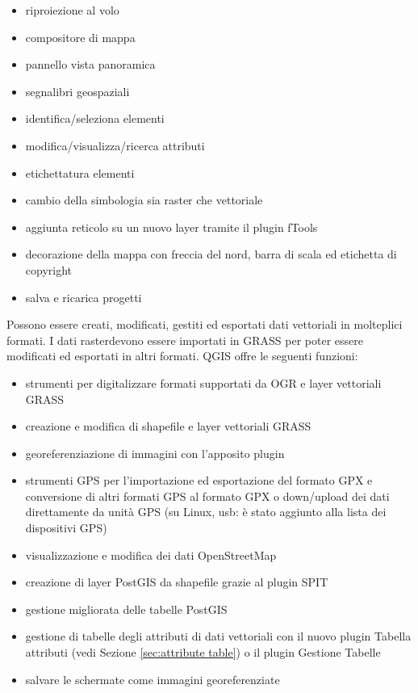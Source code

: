 \begin{itemize}[label=--]
\item riproiezione al volo
\item compositore di mappa
\item pannello vista panoramica
\item segnalibri geospaziali
\item identifica/seleziona elementi
\item modifica/visualizza/ricerca attributi
\item etichettatura elementi
\item cambio della simbologia sia raster che vettoriale
\item aggiunta reticolo su un nuovo layer tramite il plugin fTools
\item decorazione della mappa con freccia del nord, barra di scala ed etichetta di copyright
\item salva e ricarica progetti
\end{itemize}


Possono essere creati, modificati, gestiti ed esportati dati vettoriali in molteplici formati. 
I dati rasterdevono essere importati in GRASS per poter essere modificati ed esportati in 
altri formati. QGIS offre le seguenti funzioni:

\begin{itemize}[label=--]
\item strumenti per digitalizzare formati supportati da OGR e layer vettoriali GRASS
\item creazione e modifica di shapefile e layer vettoriali GRASS
\item georeferenziazione di immagini con l’apposito plugin
\item strumenti GPS per l’importazione ed esportazione del formato GPX e conversione di altri formati
GPS al formato GPX o down/upload dei dati direttamente da unità GPS (su Linux, usb: è
stato aggiunto alla lista dei dispositivi GPS)
\item visualizzazione e modifica dei dati OpenStreetMap
\item creazione di layer PostGIS da shapefile grazie al plugin SPIT 
\item gestione migliorata delle tabelle PostGIS
\item gestione di tabelle degli attributi di dati vettoriali con il nuovo plugin Tabella attributi (vedi
Sezione \ref{sec:attribute table}) o il plugin Gestione Tabelle
\item salvare le schermate come immagini georeferenziate
\end{itemize}

